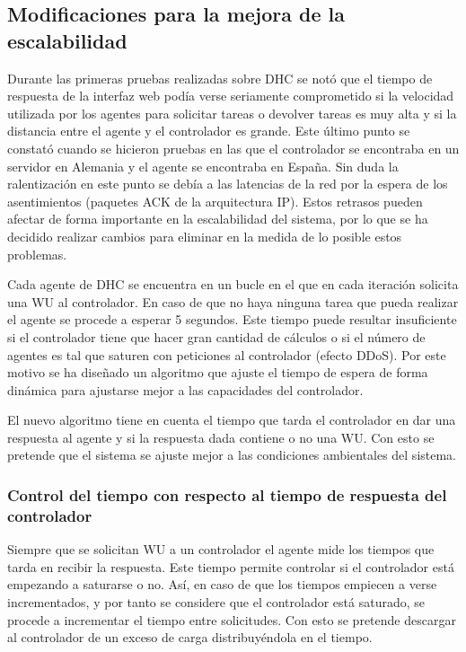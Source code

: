 \subsection{Modificaciones para la mejora de la escalabilidad}

Durante las primeras pruebas realizadas sobre DHC se notó que el tiempo de respuesta de la interfaz web podía verse seriamente comprometido si la velocidad utilizada por los agentes para solicitar tareas o devolver tareas es muy alta y si la distancia entre el agente y el controlador es grande. Este último punto se constató cuando se hicieron pruebas en las que el controlador se encontraba en un servidor en Alemania y el agente se encontraba en España. Sin duda la ralentización en este punto se debía a las latencias de la red por la espera de los asentimientos (paquetes ACK de la arquitectura IP). Estos retrasos pueden afectar de forma importante en la escalabilidad del sistema, por lo que se ha decidido realizar cambios para eliminar en la medida de lo posible estos problemas.

Cada agente de DHC se encuentra en un bucle en el que en cada iteración solicita una WU al controlador. En caso de que no haya ninguna tarea que pueda realizar el agente se procede a esperar 5 segundos. Este tiempo puede resultar insuficiente si el controlador tiene que hacer gran cantidad de cálculos o si el número de agentes es tal que saturen con peticiones al controlador (efecto DDoS). Por este motivo se ha diseñado un algoritmo que ajuste el tiempo de espera de forma dinámica para ajustarse mejor a las capacidades del controlador.

El nuevo algoritmo tiene en cuenta el tiempo que tarda el controlador en dar una respuesta al agente y si la respuesta dada contiene o no una WU. Con esto se pretende que el sistema se ajuste mejor a las condiciones ambientales del sistema.

\subsubsection{Control del tiempo con respecto al tiempo de respuesta del controlador}

Siempre que se solicitan WU a un controlador el agente mide los tiempos que tarda en recibir la respuesta. Este tiempo permite controlar si el controlador está empezando a saturarse o no. Así, en caso de que los tiempos empiecen a verse incrementados, y por tanto se considere que el controlador está saturado, se procede a incrementar el tiempo entre solicitudes. Con esto se pretende descargar al controlador de un exceso de carga distribuyéndola en el tiempo.

